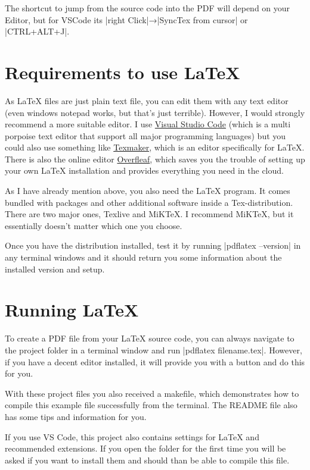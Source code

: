         The shortcut to jump from the source code into the PDF will depend on your Editor, but for VS\;Code its
        |right Click|→|SyncTex from cursor| or |CTRL+ALT+J|.

    \section{Requirements to use LaTeX}
        As LaTeX files are just plain text file, you can edit them with any text editor (even windows notepad works, but that's just terrible).
        However, I would strongly recommend a more suitable editor. I use \href{https://code.visualstudio.com/}{Visual Studio Code} (which is a multi
        porpoise text editor that support all major programming languages) but you could also use something like
        \href{https://www.xm1math.net/texmaker/}{Texmaker}, which is an editor specifically for LaTeX. There is also the online editor
        \href{https://www.overleaf.com/}{Overfleaf}, which saves you the trouble of setting up your own LaTeX installation and provides everything you
        need in the cloud.

        \pagebreak\medskip
        As I have already mention above, you also need the LaTeX program. It comes bundled with packages and other additional software inside a
        Tex-distribution. There are two major ones, Texlive and MiKTeX. I recommend MiKTeX, but it essentially doesn't matter which one you choose.

        Once you have the distribution installed, test it by running |pdflatex --version| in any terminal windows and it should return you
        some information about the installed version and setup.

    \section{Running LaTeX}
        To create a PDF file from your LaTeX source code, you can always navigate to the project folder in a terminal window and run
        |pdflatex filename.tex|. However, if you have a decent editor installed, it will provide you with a button and do this for you.

        With these project files you also received a makefile, which demonstrates how to compile this example file successfully from the terminal. The
        README file also has some tips and information for you.

        If you use VS Code, this project also contains settings for LaTeX and recommended extensions. If you open the folder for the first time you
        will be asked if you want to install them and should than be able to compile this file.

